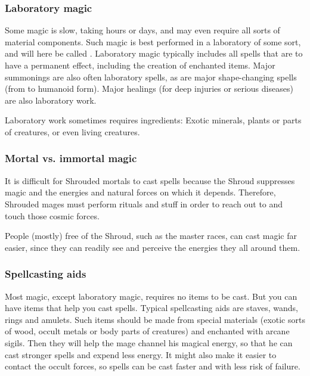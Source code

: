 \subsubsection{Laboratory magic}
Some magic is slow, taking hours or days, and may even require all sorts of material components. Such magic is best performed in a laboratory of some sort, and will here be called . Laboratory magic typically includes all spells that are to have a permanent effect, including the creation of enchanted items. Major summonings are also often laboratory spells, as are major shape-changing spells (from \dragon{} to humanoid form). Major healings (for deep injuries or serious diseases) are also laboratory work. 

Laboratory work sometimes requires ingredients: Exotic minerals, plants or parts of creatures, or even living creatures. 





\subsubsection{Mortal vs. immortal magic}
It is difficult for Shrouded mortals to cast spells because the Shroud suppresses magic and the energies and natural forces on which it depends. 
Therefore, Shrouded mages must perform rituals and stuff in order to reach out to and touch those cosmic forces. 

People (mostly) free of the Shroud, such as the master races, can cast magic far easier, since they can readily see and perceive the energies they all around them. 





\subsubsection{Spellcasting aids}
Most magic, except laboratory magic, requires no items to be cast. But you can have items that help you cast spells. Typical spellcasting aids are staves, wands, rings and amulets. Such items should be made from special materials (exotic sorts of wood, occult metals or body parts of creatures) and enchanted with arcane sigils. Then they will help the mage channel his magical energy, so that he can cast stronger spells and expend less energy. It might also make it easier to contact the occult forces, so spells can be cast faster and with less risk of failure. 

